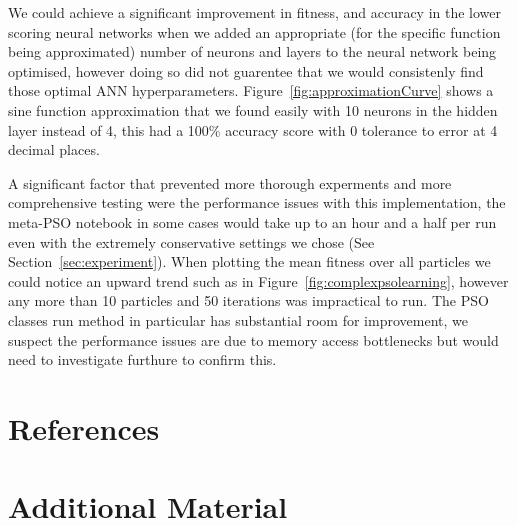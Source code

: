 \documentclass[12pt]{article}
\begin{document}
We could achieve a significant improvement in fitness, and accuracy in the lower scoring neural networks when we added an appropriate (for the specific function being approximated) number of neurons and layers to the neural network being optimised, however doing so did not guarentee that we would consistenly find those optimal ANN hyperparameters. 
Figure~\ref{fig:approximationCurve} shows a sine function approximation that we found easily with 10 neurons in the hidden layer instead of 4, this had a 100\% accuracy score with 0 tolerance to error at 4 decimal places.


A significant factor that prevented more thorough experments and more comprehensive testing were the performance issues with this implementation, the meta-PSO notebook in some cases would take up to an hour and a half per run even with the extremely conservative settings we chose (See Section~\ref{sec:experiment}).
When plotting the mean fitness over all particles we could notice an upward trend such as in Figure~\ref{fig:complexpsolearning}, however any more than 10 particles and 50 iterations was impractical to run.
The PSO classes run method in particular has substantial room for improvement, we suspect the performance issues are due to memory access bottlenecks but would need to investigate furthure to confirm this.

\pagebreak
\appendix

\section{References}
\printbibliography

\newpage
\section{Additional Material}
\end{document}
